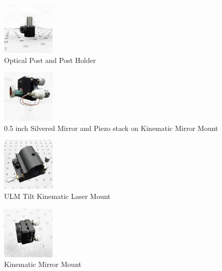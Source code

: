 \begin{figure}[!ht]
\centering
\includegraphics[width=1in]{OpticalPostwPostHolder}
\caption{Optical Post and Post Holder}
\label{fig:opticalpost_postholder}
\end{figure}


\begin{figure}[!ht]
\centering
\includegraphics[width=1in]{PiezoandMirror}
\caption{0.5 inch Silvered Mirror and Piezo stack on Kinematic Mirror Mount}
\label{fig:piezo}
\end{figure}


\begin{figure}[!ht]
\centering
\includegraphics[width=1in]{ULMTiltKinematicLaserMount}
\caption{ULM Tilt Kinematic Laser Mount}
\label{fig:lasermount}
\end{figure}

\begin{figure}[!ht]
\centering
\includegraphics[width=1in]{MirrorMount}
\caption{Kinematic Mirror Mount}
\label{fig:mirrormount}
\end{figure}